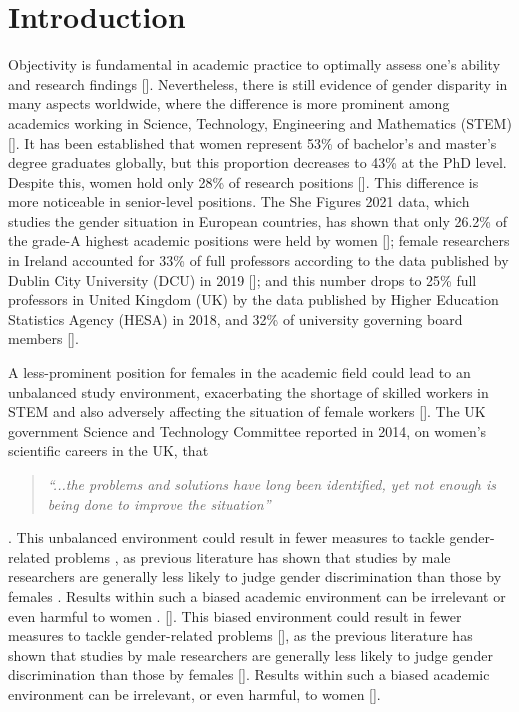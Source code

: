 \section{Introduction}

\noindent Objectivity is fundamental in academic practice to optimally assess one's ability and research findings [\cite{handley2015quality}]. Nevertheless, there is still evidence of gender disparity in many aspects worldwide, where the difference is more prominent among academics working in Science, Technology, Engineering and Mathematics (STEM) [\cite{garcia2019men}]. It has been established that women represent 53\% of bachelor's and master's degree graduates globally, but this proportion decreases to 43\% at the PhD level. Despite this, women hold only 28\% of research positions [\cite{garcia2019men}]. This difference is more noticeable in senior-level positions. The She Figures 2021 data, which studies the gender situation in European countries, has shown that only 26.2\% of the grade-A highest academic positions were held by women [\cite{EUequality}]; female researchers in Ireland accounted for 33\% of full professors according to the data published by Dublin City University (DCU) in 2019 [\cite{hosseini2021gender}]; and this number drops to 25\% full professors in United Kingdom (UK) by the data published by Higher Education Statistics Agency (HESA) in 2018, and 32\% of university governing board members [\cite{thelwall2020gender}].

A less-prominent position for females in the academic field could lead to an unbalanced study environment, exacerbating the shortage of skilled workers in STEM and also adversely affecting the situation of female workers [\cite{verdugo2022gender}]. The UK government Science and Technology Committee reported in 2014, on women's scientific careers in the UK, that \begin{quote} \it ``...the problems and solutions have long been identified, yet not enough is being done to improve the situation''\end{quote} \cite{white2022subject}. This unbalanced environment could result in fewer measures to tackle gender-related problems \cite{garcia2019men}, as previous literature has shown that studies by male researchers are generally less likely to judge gender discrimination than those by females \cite{handley2015quality}. Results within such a biased academic environment can be irrelevant or even harmful to women \cite{cislak2018bias}.
 [\cite{white2022subject}]. This biased environment could result in fewer measures to tackle gender-related problems [\cite{garcia2019men}], as the previous literature has shown that studies by male researchers are generally less likely to judge gender discrimination than those by females [\cite{handley2015quality}]. Results within such a biased academic environment can be irrelevant, or even harmful, to women [\cite{cislak2018bias}]. 

